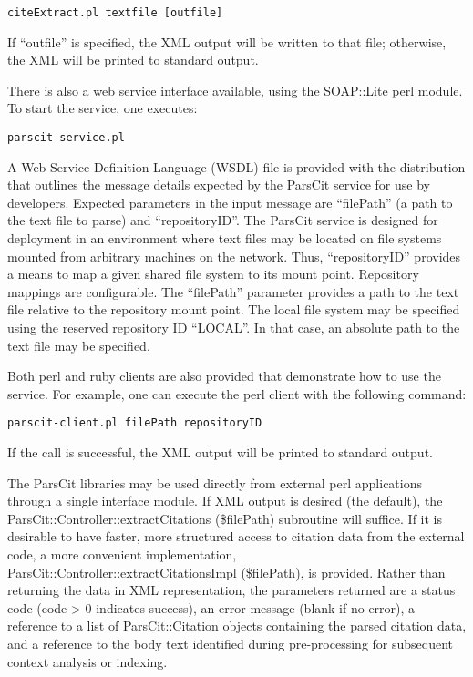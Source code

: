 \documentclass[10pt, a4paper]{article}
\begin{document}
\vspace{.2cm}
\parbox[h]{\columnwidth}{{\tt citeExtract.pl textfile [outfile]}}
\vspace{.2cm}

If ``outfile'' is specified, the XML output will be written to that
file; otherwise, the XML will be printed to standard output.

There is also a web service interface available, using the SOAP::Lite
perl module. To start the service, one executes:

\vspace{.2cm}
\parbox[h]{\columnwidth}{{\tt parscit-service.pl}}
\vspace{.2cm}

A Web Service Definition Language (WSDL) file is provided with the
distribution that outlines the message details expected by the ParsCit
service for use by developers. Expected parameters in the input
message are ``filePath'' (a path to the text file to parse) and
``repositoryID''. The ParsCit service is designed for deployment in an
environment where text files may be located on file systems mounted
from arbitrary machines on the network. Thus, ``repositoryID''
provides a means to map a given shared file system to its mount
point. Repository mappings are configurable. The ``filePath''
parameter provides a path to the text file relative to the repository
mount point. The local file system may be specified using the reserved
repository ID ``LOCAL''. In that case, an absolute path to the text
file may be specified.

Both perl and ruby clients are also provided that demonstrate how to
use the service. For example, one can execute the perl client with the
following command:

\vspace{.2cm}
\parbox[h]{\columnwidth}{{\tt parscit-client.pl filePath repositoryID}}
\vspace{.2cm}

If the call is successful, the XML output will be printed to standard
output.

The ParsCit libraries may be used directly from external
perl applications through a single interface module.  If XML
output is desired (the default), the ParsCit::Controller::extractCitations
(\$filePath) subroutine will suffice. If it is desirable to have faster, more
structured access to citation data from the external code, a
more convenient implementation, ParsCit::Controller::extractCitationsImpl
(\$filePath), is provided. Rather than returning the data in XML
representation, the parameters returned are a status code (code > 0
indicates success), an error message (blank if no error), a reference
to a list of ParsCit::Citation objects containing the parsed citation
data, and a reference to the body text identified during
pre-processing for subsequent context analysis or indexing.
\end{document}

